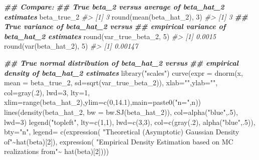 \documentclass[
  14pt,
]{memoir}
\newenvironment{Shaded}{\begin{snugshade}}{\end{snugshade}}
\newcommand{\AttributeTok}[1]{\textcolor[rgb]{0.77,0.63,0.00}{#1}}
\newcommand{\CommentTok}[1]{\textcolor[rgb]{0.56,0.35,0.01}{\textit{#1}}}
\newcommand{\DecValTok}[1]{\textcolor[rgb]{0.00,0.00,0.81}{#1}}
\newcommand{\DocumentationTok}[1]{\textcolor[rgb]{0.56,0.35,0.01}{\textbf{\textit{#1}}}}
\newcommand{\FloatTok}[1]{\textcolor[rgb]{0.00,0.00,0.81}{#1}}
\newcommand{\FunctionTok}[1]{\textcolor[rgb]{0.00,0.00,0.00}{#1}}
\newcommand{\NormalTok}[1]{#1}
\newcommand{\SpecialCharTok}[1]{\textcolor[rgb]{0.00,0.00,0.00}{#1}}
\newcommand{\StringTok}[1]{\textcolor[rgb]{0.31,0.60,0.02}{#1}}
\begin{document}
\begin{Shaded}
\begin{Highlighting}[]
\DocumentationTok{\#\# Compare:}
\DocumentationTok{\#\# True beta\_2 versus average of beta\_hat\_2 estimates}
\NormalTok{beta\_true\_2}
\CommentTok{\#\textgreater{} [1] 3}
\FunctionTok{round}\NormalTok{(}\FunctionTok{mean}\NormalTok{(beta\_hat\_2), }\DecValTok{3}\NormalTok{)}
\CommentTok{\#\textgreater{} [1] 3}
\DocumentationTok{\#\# True variance of beta\_hat\_2 versus }
\DocumentationTok{\#\# empirical variance of beta\_hat\_2 estimates}
\FunctionTok{round}\NormalTok{(var\_true\_beta\_2, }\DecValTok{5}\NormalTok{)}
\CommentTok{\#\textgreater{} [1] 0.0015}
\FunctionTok{round}\NormalTok{(}\FunctionTok{var}\NormalTok{(beta\_hat\_2), }\DecValTok{5}\NormalTok{)}
\CommentTok{\#\textgreater{} [1] 0.00147}

\DocumentationTok{\#\# True normal distribution of beta\_hat\_2 versus }
\DocumentationTok{\#\# empirical density of beta\_hat\_2 estimates}
\FunctionTok{library}\NormalTok{(}\StringTok{"scales"}\NormalTok{)}
\FunctionTok{curve}\NormalTok{(}\AttributeTok{expr =} \FunctionTok{dnorm}\NormalTok{(x, }\AttributeTok{mean =}\NormalTok{ beta\_true\_2, }
                   \AttributeTok{sd=}\FunctionTok{sqrt}\NormalTok{(var\_true\_beta\_2)), }
      \AttributeTok{xlab=}\StringTok{""}\NormalTok{,}\AttributeTok{ylab=}\StringTok{""}\NormalTok{, }\AttributeTok{col=}\FunctionTok{gray}\NormalTok{(.}\DecValTok{2}\NormalTok{), }\AttributeTok{lwd=}\DecValTok{3}\NormalTok{, }\AttributeTok{lty=}\DecValTok{1}\NormalTok{, }
\AttributeTok{xlim=}\FunctionTok{range}\NormalTok{(beta\_hat\_2),}\AttributeTok{ylim=}\FunctionTok{c}\NormalTok{(}\DecValTok{0}\NormalTok{,}\FloatTok{14.1}\NormalTok{),}\AttributeTok{main=}\FunctionTok{paste0}\NormalTok{(}\StringTok{"n="}\NormalTok{,n))}
\FunctionTok{lines}\NormalTok{(}\FunctionTok{density}\NormalTok{(beta\_hat\_2, }\AttributeTok{bw =} \FunctionTok{bw.SJ}\NormalTok{(beta\_hat\_2)), }
      \AttributeTok{col=}\FunctionTok{alpha}\NormalTok{(}\StringTok{"blue"}\NormalTok{,.}\DecValTok{5}\NormalTok{), }\AttributeTok{lwd=}\DecValTok{3}\NormalTok{)}
\FunctionTok{legend}\NormalTok{(}\StringTok{"topleft"}\NormalTok{, }\AttributeTok{lty=}\FunctionTok{c}\NormalTok{(}\DecValTok{1}\NormalTok{,}\DecValTok{1}\NormalTok{), }\AttributeTok{lwd=}\FunctionTok{c}\NormalTok{(}\DecValTok{3}\NormalTok{,}\DecValTok{3}\NormalTok{), }
     \AttributeTok{col=}\FunctionTok{c}\NormalTok{(}\FunctionTok{gray}\NormalTok{(.}\DecValTok{2}\NormalTok{), }\FunctionTok{alpha}\NormalTok{(}\StringTok{"blue"}\NormalTok{,.}\DecValTok{5}\NormalTok{)), }\AttributeTok{bty=}\StringTok{"n"}\NormalTok{, }\AttributeTok{legend=} 
\FunctionTok{c}\NormalTok{(}\FunctionTok{expression}\NormalTok{(}
  \StringTok{"Theoretical (Asymptotic) Gaussian Density of"}\SpecialCharTok{\textasciitilde{}}\FunctionTok{hat}\NormalTok{(beta)[}\DecValTok{2}\NormalTok{]), }
  \FunctionTok{expression}\NormalTok{(}
  \StringTok{"Empirical Density Estimation based on MC realizations from"}\SpecialCharTok{\textasciitilde{}}
  \FunctionTok{hat}\NormalTok{(beta)[}\DecValTok{2}\NormalTok{])))}
\end{Highlighting}
\end{Shaded}
\end{document}
